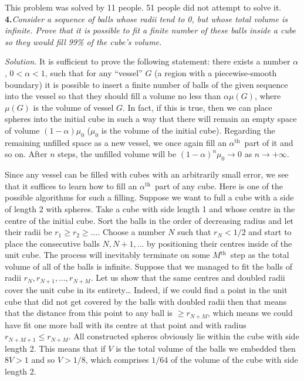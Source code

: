 \documentclass[12pt]{amsart}
\renewcommand{\th}{$^\text{th}$~}
\begin{document}
This problem was solved by 11 people.
51 people did not attempt to solve it.\\

\textbf{4.}\quad\textit{Consider a sequence of balls whose radii tend to 0, but
whose total volume is infinite.
Prove that it is possible to fit a finite number of these balls inside a cube so
they would fill 99\% of the cube's volume.}

\textit{Solution.}
It is sufficient to prove the following statement: there exists a number
$\alpha$, $0<\alpha<1$, such that for any ``vessel'' $G$ (a region with a
piecewise-smooth boundary) it is possible to insert a finite number of balls of
the given sequence into the vessel so that they should fill a volume no
less than $\alpha\mu(G)$, where $\mu(G)$ is the volume of vessel $G$.
In fact, if this is true, then we can place spheres into the initial cube in
such a way that there will remain an empty space of volume $(1-\alpha)\mu_0$
($\mu_0$ is the volume of the initial cube).
Regarding the remaining unfilled space as a new vessel, we once again
fill an $\alpha$\th part of it and so on.
After $n$ steps, the unfilled volume will be $(1-\alpha)^n\mu_0\to0$ as
$n\to+\infty$.

Since any vessel can be filled with cubes with an arbitrarily small error, we
see that it suffices to learn how to fill an $\alpha$\th part of any cube.
Here is one of the possible algorithms for such a filling.
Suppose we want to full a cube with a side of length 2 with spheres.
Take a cube with side length 1 and whose centre in the centre of the
initial cube.
Sort the balls in the order of decreasing radius and let their radii be
$r_1\geq r_2\geq\dots$.
Choose a number $N$ such that $r_N<1/2$ and start to place the
consecutive balls $N,N+1,\dots$ by positioning their centres inside of the unit
cube.
The process will inevitably terminate on some $M$\th step as the total volume of
all of the balls is infinite.
Suppose that we managed to fit the balls of radii $r_N,r_{N+1},\dots,r_{N+M}$.
Let us show that the same centres and doubled radii cover the unit cube in its
entirety\dots
Indeed, if we could find a point in the unit cube that did not get covered by
the balls with doubled radii then that means that the distance from this point
to any ball is $\geq r_{N+M}$, which means we could have fit one more ball with
its centre at that point and with radius $r_{N+M+1}\leq r_{N+M}$.
All constructed spheres obviously lie within the cube with side length 2.
This means that if $V$ is the total volume of the balls we embedded then $8V>1$
and so $V>1/8$, which comprises $1/64$ of the volume of the cube with side
length 2.
\end{document}

